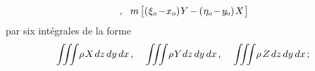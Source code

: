 \documentclass[11pt, twoside, leqno]{article}
\begin{document}
\begin{equation*}
\begin{array}{c}
\hspace{.5ex} \text{,} \hspace{.8em}
m \hspace{1.5pt} \bigl[ (\hspace{.1ex} \xi_o \hspace{-0.3ex}-\hspace{-0.4ex} x_o ) \hspace{.15ex} Y \hspace{-0.2ex} - \hspace{-0.1ex} (\hspace{.1ex} \eta_o \hspace{-0.3ex}-\hspace{-0.3ex} y_{\hspace{-0.14ex}o} ) \hspace{.15ex} X \hspace{.15ex}\bigr]
\end{array}
\end{equation*}
par six intégrales de la forme
\begin{equation*}
\displaystyle\iiint \hspace{-0.4ex} \rho \hspace{.2ex} X \hspace{.2ex} dz \, dy \, dx \hspace{.3ex} \text{,} \hspace{1.1em}
\displaystyle\iiint \hspace{-0.4ex} \rho \hspace{.15ex} Y \hspace{.1ex} dz \, dy \, dx \hspace{.3ex} \text{,} \hspace{1.1em}
\displaystyle\iiint \hspace{-0.4ex} \rho \hspace{.3ex} Z \hspace{.3ex} dz \, dy \, dx \hspace{.3ex} \text{;}
\end{equation*}
\end{document}
